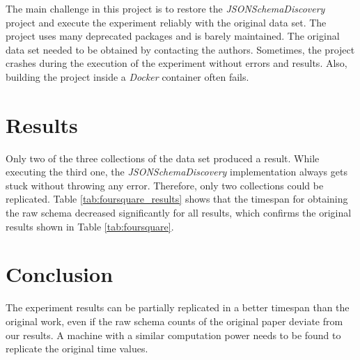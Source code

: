 \documentclass[sigconf, nonacm]{acmart}
\begin{document}
The main challenge in this project is to restore the \textit{JSONSchemaDiscovery} project and execute the experiment reliably with the original data set. The project uses many deprecated packages and is barely maintained. The original data set needed to be obtained by contacting the authors. Sometimes, the project crashes during the execution of the experiment without errors and results. Also, building the project inside a \textit{Docker} container often fails.

\section{Results}

Only two of the three collections of the data set produced a result. While executing the third one, the \textit{JSONSchemaDiscovery} implementation always gets stuck without throwing any error. Therefore, only two collections could be replicated.
Table \ref{tab:foursquare_results} shows that the timespan for obtaining the raw schema decreased significantly for all results, which confirms the original results shown in Table \ref{tab:foursquare}.

\section{Conclusion}

The experiment results can be partially replicated in a better timespan than the original work, even if the raw schema counts of the original paper deviate from our results. A machine with a similar computation power needs to be found to replicate the original time values.




\end{document}
